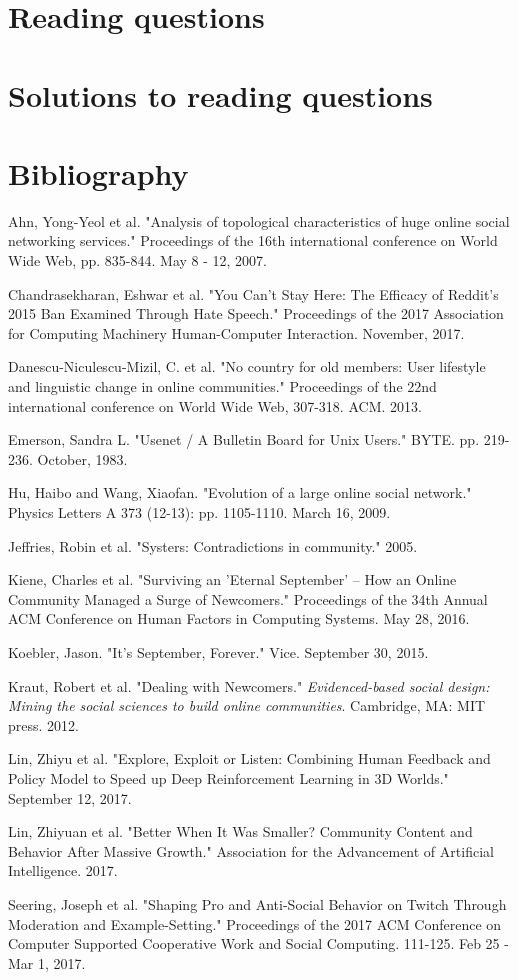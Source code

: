 \documentclass[class=book, crop=false]{standalone}
\begin{document}
\section{Reading questions}

\section{Solutions to reading questions}

\section{Bibliography}

Ahn, Yong-Yeol et al. "Analysis of topological characteristics of huge online social networking services." Proceedings of the 16th international conference on World Wide Web, pp. 835-844. May 8 - 12, 2007.

Chandrasekharan, Eshwar et al. "You Can't Stay Here: The Efficacy of Reddit's 2015 Ban Examined Through Hate Speech." Proceedings of the 2017 Association for Computing Machinery Human-Computer Interaction. November, 2017.

Danescu-Niculescu-Mizil, C. et al. "No country for old members: User lifestyle and linguistic change in online communities." Proceedings of the 22nd international conference on World Wide Web, 307-318. ACM. 2013.

Emerson, Sandra L. "Usenet / A Bulletin Board for Unix Users." BYTE. pp. 219-236. October, 1983.

Hu, Haibo and Wang, Xiaofan. "Evolution of a large online social network." Physics Letters A 373 (12-13): pp. 1105-1110. March 16, 2009.

Jeffries, Robin et al. "Systers: Contradictions in community." 2005.

Kiene, Charles et al. "Surviving an 'Eternal September' -- How an Online Community Managed a Surge of Newcomers." Proceedings of the 34th Annual ACM Conference on Human Factors in Computing Systems. May 28, 2016.

Koebler, Jason. "It's September, Forever." Vice. September 30, 2015.

Kraut, Robert et al. "Dealing with Newcomers." \textit{Evidenced-based social design: Mining the social sciences to build online communities}. Cambridge, MA: MIT press. 2012.

Lin, Zhiyu et al. "Explore, Exploit or Listen: Combining Human Feedback and Policy Model to Speed up Deep Reinforcement Learning in 3D Worlds." September 12, 2017.

Lin, Zhiyuan et al. "Better When It Was Smaller? Community Content and Behavior After Massive Growth." Association for the Advancement of Artificial Intelligence. 2017.

Seering, Joseph et al. "Shaping Pro and Anti-Social Behavior on Twitch Through Moderation and Example-Setting." Proceedings of the 2017 ACM Conference on Computer Supported Cooperative Work and Social Computing. 111-125. Feb 25 - Mar 1, 2017.
\end{document}
